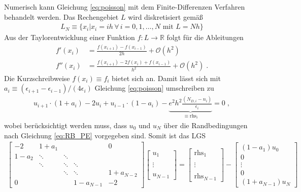 Numerisch kann Gleichung \eqref{eq:poisson} mit dem Finite-Differenzen Verfahren behandelt werden. Das Rechengebiet $L$ wird diskretisiert gemäß
\begin{align*}
  L_N \equiv \{x_i | x_i = i h \,\forall\, i = 0,1,\dots,N\text{ mit }L=Nh\}
\end{align*}
Aus der Taylorentwicklung einer Funktion $f:L \rightarrow \mathbb{R}$ folgt für die Ableitungen
\begin{align*}
  f'(x_i) &= \frac{f(x_{i+1}) - f(x_{i-1})}{2h} + \mathcal{O}(h^2) \\
  f''(x_i) &= \frac{f(x_{i+1}) - 2f(x_i) + f(x_{i-1})}{h^2} + \mathcal{O}(h^2) \; .
\end{align*}
Die Kurzschreibweise $f(x_i)\equiv f_i$ bietet sich an.
Damit lässt sich mit $a_i\equiv (\epsilon_{i+1} - \epsilon_{i-1})/(4\epsilon_i)$ Gleichung \eqref{eq:poisson} umschreiben zu
\begin{align}
  u_{i+1}\cdot(1+a_i) -2 u_i + u_{i-1}\cdot(1-a_i) - \underbrace{e^2h^2\frac{(N_{D,i} - n_i)}{\epsilon_i}}_{\equiv \text{rhs}_i} = 0\; ,
  \label{eq:discretePE}
\end{align}
wobei berücksichtigt werden muss, dass $u_0$ und $u_N$ über die Randbedingungen nach Gleichung \eqref{eq:RB_PE} vorgegeben sind. Somit ist das LGS
\begin{align*}
  \left[ \begin{matrix}-2 & 1+a_1 & & & 0\\1-a_2 & \ddots & \ddots & & \\ & \ddots & \ddots & \ddots & \\& & \ddots & \ddots &  1+a_{N-2} \\0 & &  & 1-a_{N-1} & -2  \end{matrix}  \right]
  \left[ \begin{matrix}u_1             \\                          \\ \vdots                       \\                           \\u_{N-1}  \end{matrix}  \right]
  = \left[ \begin{matrix}\text{rhs}_1  \\                          \\ \vdots                       \\                         \\\text{rhs}_{N-1}  \end{matrix}  \right]
   - \left[ \begin{matrix}(1-a_1)u_0     \\0                         \\ \vdots                      \\0                        \\(1+a_{N-1})u_N  \end{matrix}  \right]
\end{align*}
